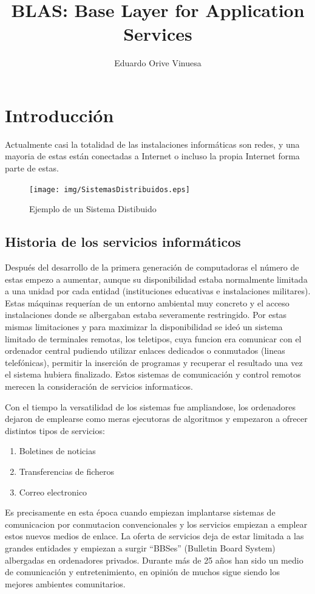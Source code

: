 \documentclass[a4paper,spanish,12pt]{book}
\title{BLAS: Base Layer for Application Services}
\author{Eduardo Orive Vinuesa}
\begin{document}
\tableofcontents

\maketitle

\chapter{Introducción}
Actualmente casi la totalidad de las instalaciones inform\'aticas son redes, y una mayoria de estas est\'an conectadas a Internet o incluso la propia Internet forma parte de estas.

\begin{figure}[h] %
	\texttt{[image: img/SistemasDistribuidos.eps]}	
	\caption{Ejemplo de un Sistema Distibuido}
	\label{fig:SistemasDistribuidos}
\end{figure}
\section{Historia de los servicios informáticos}
Despu\'es del desarrollo de la primera generación de computadoras el número de estas empezo a aumentar, aunque su disponibilidad estaba normalmente limitada a una unidad por cada entidad (instituciones educativas e instalaciones militares). Estas máquinas requerían de un entorno ambiental muy concreto y el acceso instalaciones donde se albergaban estaba severamente restringido. Por estas mismas limitaciones y para maximizar la disponibilidad se ideó un sistema limitado de terminales remotas, los teletipos, cuya funcion era comunicar con el ordenador central pudiendo utilizar enlaces dedicados o conmutados (lineas telefónicas), permitir la inserción de programas y recuperar el resultado una vez el sistema hubiera finalizado. Estos sistemas de comunicación y control remotos merecen la consideración de servicios informaticos.

Con el tiempo la versatilidad de los sistemas fue ampliandose, los ordenadores dejaron de emplearse como meras ejecutoras de algoritmos y empezaron a ofrecer distintos tipos de servicios:
\begin{enumerate}
	\item Boletines de noticias
	\item Transferencias de ficheros
	\item Correo electronico
\end{enumerate}
Es precisamente en esta \'epoca cuando empiezan implantarse sistemas de comunicacion por conmutacion convencionales y los servicios empiezan a emplear estos nuevos medios de enlace. La oferta de servicios deja de estar limitada a las grandes entidades y empiezan a surgir ``BBSes'' (Bulletin Board System) albergadas en ordenadores privados. Durante más de 25 años han sido un medio de comunicación y entretenimiento, en opinión de muchos sigue siendo los mejores ambientes comunitarios. 
\end{document}
